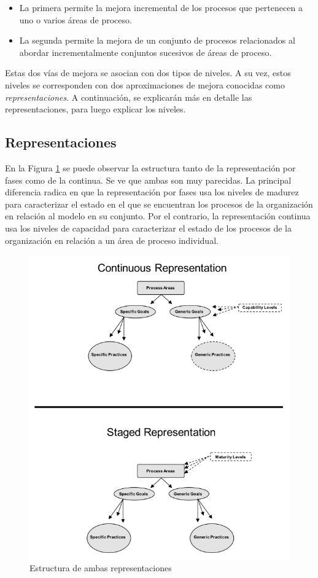 \begin{itemize}
\begin{itemize}
\item La primera permite la mejora incremental de los procesos que pertenecen a uno o varios áreas de proceso.
\item La segunda permite la mejora de un conjunto de procesos relacionados al abordar incrementalmente conjuntos sucesivos de áreas de proceso.
\end{itemize}

Estas dos vías de mejora se asocian con dos tipos de niveles. A su vez, estos niveles se corresponden con dos aproximaciones de mejora conocidas como \textit{representaciones}. A continuación, se explicarán más en detalle las representaciones, para luego explicar los niveles.

\subsection{Representaciones}
En la Figura \ref{fig:representations} se puede observar la estructura tanto de la representación por fases como de la continua. Se ve que ambas son muy parecidas. La principal diferencia radica en que la representación por fases usa los niveles de madurez para caracterizar el estado en el que se encuentran los procesos de la organización en relación al modelo en su conjunto. Por el contrario, la representación continua usa los niveles de capacidad para caracterizar el estado de los procesos de la organización en relación a un área de proceso individual.

\begin{figure}[h]
	\centering
	\includegraphics[scale=1]{Images/representations.PNG}
	\caption{Estructura de ambas representaciones}
	\label{fig:representations}
\end{figure}


\end{itemize}
